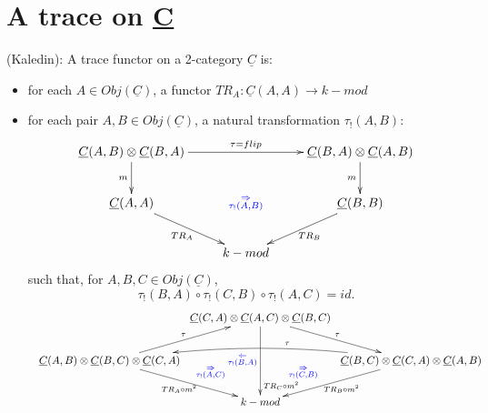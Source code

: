 \section{A trace on \underline{C}} \label{sec:2cat_trace_eg}
%
\begin{defn} \label{def:trace_functor}
(Kaledin): A trace functor on a 
2-category $\underline{C}$ is:
\begin{itemize}
	\item for each $A \in Obj(\underline{C})$, a functor 
	$TR_A: \underline{C}(A,A) \to k-mod$
	\item for each pair $A, B \in Obj(\underline{C})$, a natural transformation
	$\tau_!(A,B)$:
	$$\xymatrix{
	\underline{C}(A,B) \otimes \underline{C}(B,A)
	\ar[rr]^{\tau = flip}
	\ar[d]_{m}
	&& \underline{C}(B,A) \otimes \underline{C}(A,B)
	\ar[d]_{m} \\
	\underline{C}(A,A)
	\ar[rd]_{TR_A}
	& \textcolor{blue}{\substack{\Rightarrow\\ \tau_!(A,B)}}
	& \underline{C}(B,B) 
	\ar[ld]^{TR_B}\\
	& k-mod
	}$$
	such that, for $A,B,C \in Obj(\underline{C})$, 
	\begin{equation*} 
	\tau_!(B,A) \circ \tau_!(C,B) \circ \tau_!(A,C) = id.
	\end{equation*}
	$$\resizebox{0.75\vsize}{!}{
	\xymatrixcolsep{0.25pc}
	\xymatrix{
	& \underline{C}(C,A) \otimes \underline{C}(A,C) \otimes \underline{C}(B,C) 
	\ar[rd]^{\tau}
	\ar[dd]_{\textcolor{blue}{
		\substack{\Leftarrow\\ \tau_!(B,A)}}}^{\substack{
		\\\\\\\\\\\\\\\\\\TR_C \circ m^2}}\\
	\underline{C}(A,B) \otimes \underline{C}(B,C) \otimes \underline{C}(C,A) 
	\ar[ru]^{\tau}
	\ar[rd]^{\textcolor{blue}{\quad \quad \quad \substack{\Rightarrow\\ \tau_!(A,C)}}}_{TR_A\circ m^2}
	&& \underline{C}(B,C) \otimes \underline{C}(C,A) \otimes \underline{C}(A,B)
	\ar@/_1pc/[ll]_{\quad \quad \quad \quad \quad \tau}
	\ar[ld]_{\textcolor{blue}{\substack{\Rightarrow\\ \tau_!(C,B)}}\quad \quad\quad \quad}^{TR_B \circ m^2}\\
	& k-mod
	}}$$
\end{itemize}
\end{defn}
